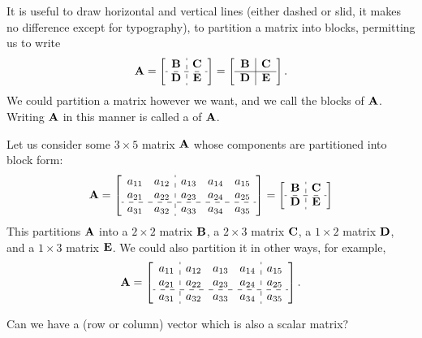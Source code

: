It is useful to draw horizontal and vertical lines (either dashed or
slid, it makes no difference except for typography), to partition a
matrix into blocks, permitting us to write
\begin{equation}
\mat{A} = \left[
    \begin{array}{c:c}
        \mat{B} & \mat{C} \\ \hdashline
        \mat{D} & \mat{E} 
    \end{array}
\right] = \left[
    \begin{array}{c|c}
        \mat{B} & \mat{C} \\ \hline
        \mat{D} & \mat{E} 
    \end{array}
\right].
\end{equation}
We could partition a matrix however we want, and we call the blocks
 of $\mathbf{A}$. Writing $\mathbf{A}$ in this manner is
called a  of $\mathbf{A}$.

\begin{example}
  Let us consider some $3\times 5$ matrix $\mathbf{A}$ whose components are
  partitioned into block form:
  \begin{equation}
    \mat{A} = \left[\begin{array}{cc:ccc}
      a_{11} & a_{12} & a_{13} & a_{14} & a_{15}\\
      a_{21} & a_{22} & a_{23} & a_{24} & a_{25}\\ \hdashline
      a_{31} & a_{32} & a_{33} & a_{34} & a_{35}
    \end{array}\right] = \left[
    \begin{array}{c:c}
        \mat{B} & \mat{C} \\ \hdashline
        \mat{D} & \mat{E} 
    \end{array}
\right]
  \end{equation}
  This partitions $\mathbf{A}$ into a $2\times 2$ matrix $\mathbf{B}$, a
  $2\times3$ matrix $\mathbf{C}$, a $1\times2$ matrix $\mathbf{D}$, and a
  $1\times 3$ matrix $\mathbf{E}$. We could also partition it in other
  ways, for example,
\begin{equation}
    \mat{A} = \left[\begin{array}{c:ccc:c}
      a_{11} & a_{12} & a_{13} & a_{14} & a_{15}\\
      a_{21} & a_{22} & a_{23} & a_{24} & a_{25}\\ \hdashline
      a_{31} & a_{32} & a_{33} & a_{34} & a_{35}
    \end{array}\right].
\end{equation}
\end{example}

\begin{exercise}
Can we have a (row or column) vector which is also a scalar matrix?
\end{exercise}